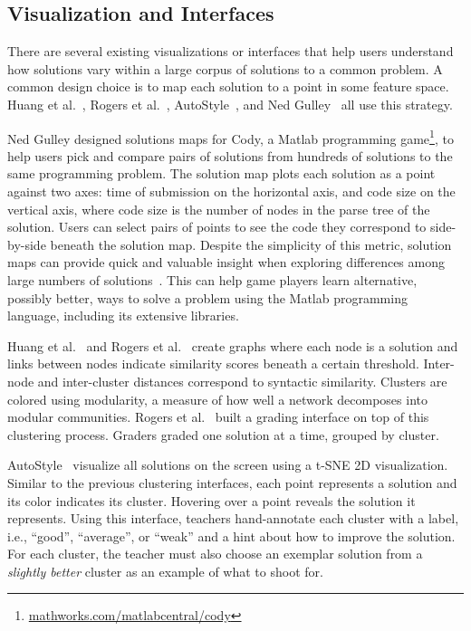 
\subsection{Visualization and Interfaces}

There are several existing visualizations or interfaces that help users understand how solutions vary within a large corpus of solutions to a common problem. A common design choice is to map each solution to a point in some feature space. Huang et al.~\cite{MOOCshop}, Rogers et al.~\cite{ACESthesis}, AutoStyle~\cite{choudhury2016autostyle}, and Ned Gulley~\cite{ICERGlassman} all use this strategy. %


Ned Gulley designed solutions maps for Cody, a Matlab programming game\footnote{\url{mathworks.com/matlabcentral/cody}}, to help users pick and compare pairs of solutions from hundreds of solutions to the same programming problem. The solution map plots each solution as a point against two axes: time of submission on the horizontal axis, and code size on the vertical axis, where code size is the number of nodes in the parse tree of the solution. Users can select pairs of points to see the code they correspond to side-by-side beneath the solution map. Despite the simplicity of this metric, solution maps can provide quick and valuable insight when exploring differences among large numbers of solutions~\cite{ICERGlassman}. This can help game players learn alternative, possibly better, ways to solve a problem using the Matlab programming language, including its extensive libraries.

Huang et al.~\cite{MOOCshop} and Rogers et al.~\cite{ACESthesis} create graphs where each node is a solution and links between nodes indicate similarity scores beneath a certain threshold. Inter-node and inter-cluster distances correspond to syntactic similarity. Clusters are colored using modularity, a measure of how well a network decomposes into modular communities. Rogers et al.~\cite{ACESthesis} built a grading interface on top of this clustering process. Graders graded one solution at a time, grouped by cluster.

AutoStyle~\cite{choudhury2016autostyle} visualize all solutions on the screen using a t-SNE 2D visualization. Similar to the previous clustering interfaces, each point represents a solution and its color indicates its cluster. Hovering over a point reveals the solution it represents. Using this interface, teachers hand-annotate each cluster with a label, i.e., ``good'', ``average'', or ``weak'' and a hint about how to improve the solution. For each cluster, the teacher must also choose an exemplar solution from a {\it slightly better} cluster as an example of what to shoot for.

